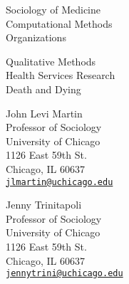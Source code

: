 \documentclass[11pt,article,oneside]{memoir}
\begin{document}
\medskip
{}
\bigskip

\vskip 25pt

\noindent\begin{minipage}{\textwidth}
	\begin{minipage}{0.5\textwidth}
	Sociology of Medicine \\ Computational Methods \\ Organizations
	\end{minipage}\hfill
	\begin{minipage}{0.5\textwidth}
	Qualitative Methods \\ Health Services Research \\ Death and Dying
	\end{minipage}%
\end{minipage}

\bigskip
{}
\bigskip

\begin{minipage}[t]{0.48\textwidth}
	John Levi Martin \\
	Professor of Sociology \\
	University of Chicago \\
	1126 East 59th St. \\
	Chicago, IL 60637 \\
	\texttt{\href{mailto:jlmartin@uchicago.edu}{jlmartin@uchicago.edu}}
\end{minipage}
\hfill
\begin{minipage}[t]{0.48\textwidth}
	Jenny Trinitapoli \\
	Professor of Sociology \\
	University of Chicago \\
	1126 East 59th St. \\
	Chicago, IL 60637 \\
	\texttt{\href{mailto:jennytrini@uchicago.edu}{jennytrini@uchicago.edu}} \\
\end{minipage} \\
\end{document}
